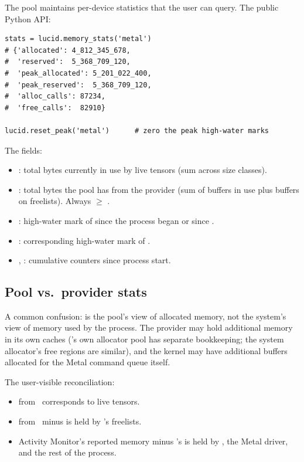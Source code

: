 The pool maintains per-device statistics that the user can query.
The public Python API:

\begin{lstlisting}[style=lucid,language=LucidPython]
stats = lucid.memory_stats('metal')
# {'allocated': 4_812_345_678,
#  'reserved':  5_368_709_120,
#  'peak_allocated': 5_201_022_400,
#  'peak_reserved':  5_368_709_120,
#  'alloc_calls': 87234,
#  'free_calls':  82910}

lucid.reset_peak('metal')      # zero the peak high-water marks
\end{lstlisting}

The fields:

\begin{itemize}
  \item {}: total bytes currently in use by live
    tensors (sum across size classes).
  \item {}: total bytes the pool has from the
    provider (sum of buffers in use plus buffers on freelists).
    Always $\geq$ .
  \item {}: high-water mark of 
    since the process began or since .
  \item {}: corresponding high-water mark of
    .
  \item {}, : cumulative
    counters since process start.
\end{itemize}

\subsection{Pool vs.\ provider stats}
\label{ssec:allocator:pool_vs_provider}

A common confusion:  is
the pool's view of allocated memory, not the system's view of
memory used by the process. The provider may hold additional memory
in its own caches (\MLX's own allocator pool has separate
bookkeeping; the system allocator's free regions are similar), and
the kernel may have additional buffers allocated for the Metal
command queue itself.

The user-visible reconciliation:

\begin{itemize}
  \item {} from \Lucid\ corresponds to live tensors.
  \item {} from \Lucid\ minus  is
    held by \Lucid's freelists.
  \item Activity Monitor's reported memory minus \Lucid's
     is held by \MLX, the Metal driver, and the
    rest of the process.
\end{itemize}

